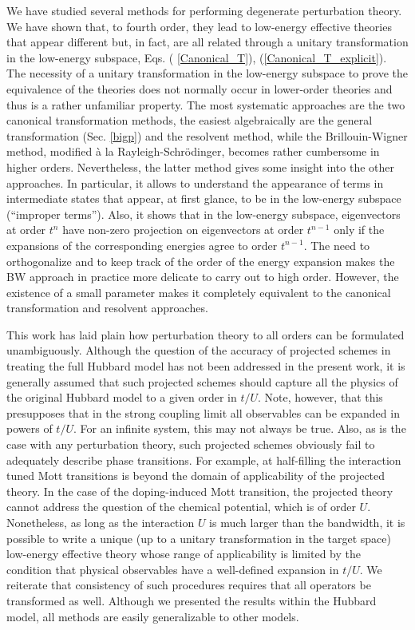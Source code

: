 \documentclass[floatfix,twocolumn,aps,prb,showpacs,superscriptaddress]{revtex4}
\begin{document}
We have studied several methods for performing degenerate perturbation theory.
We have shown that, to fourth order, they lead to low-energy effective
theories that appear different but, in fact, are all
related through a unitary transformation in the low-energy subspace,
Eqs. (%
\ref{Canonical_T}), (\ref{Canonical_T_explicit}). The necessity of a unitary
transformation in the low-energy subspace to prove the equivalence of the
theories does not normally occur in lower-order theories
and thus is a rather unfamiliar property.
The most systematic approaches are the two canonical transformation methods,
the easiest algebraically are the general transformation (Sec. \ref{bigp})
and the resolvent method, while the
Brillouin-Wigner method, modified \`{a} la Rayleigh-Schr\"{o}dinger,
becomes rather cumbersome in higher orders.
Nevertheless, the latter method gives some
insight into the other approaches. In particular, it allows to understand
the appearance of terms in intermediate states that appear, at first glance,
to be in the low-energy subspace (\textquotedblleft improper
terms\textquotedblright ). Also, it shows that in the low-energy subspace,
eigenvectors at order $t^{n}$ have non-zero projection on eigenvectors at
order $t^{n-1}$ only if the expansions of the corresponding energies agree
to order $t^{n-1}$. The need to orthogonalize and to keep track of the order
of the energy expansion makes the BW approach in practice more delicate to
carry out to high order. However, the existence of a small parameter makes
it completely equivalent to the canonical transformation and resolvent
approaches.


This work has laid plain how perturbation
theory to all orders can be formulated unambiguously. 
Although the question of the accuracy of
projected schemes in treating the full Hubbard model has not been
addressed in the present work,
 it is generally assumed 
that such projected schemes should capture all the physics of the
original Hubbard model to a given order in $t/U$. Note, however, that
this presupposes that in the strong coupling limit all observables
 can be expanded in powers of $t/U$. For an infinite system, this may
 not always be true.
 Also, as is the case with any
 perturbation theory, such projected schemes obviously fail
 to adequately describe phase transitions. For example, at
 half-filling the interaction tuned Mott transitions is beyond the
 domain of applicability of the projected theory. In the case of the
 doping-induced Mott transition, the projected theory cannot address
 the question of the chemical potential, which is of order $U$. 
 Nonetheless, as long as the interaction $U$ is much larger than the
bandwidth, it is possible to write a unique (up to a unitary
transformation in the target space) low-energy effective theory whose
range of applicability is limited by the condition that physical
observables have a well-defined expansion in $t/U$.  We reiterate that
consistency of such procedures requires that all operators be
transformed as well. 
Although we presented the results within the Hubbard model, all  methods
are easily generalizable to other models.
\end{document}
